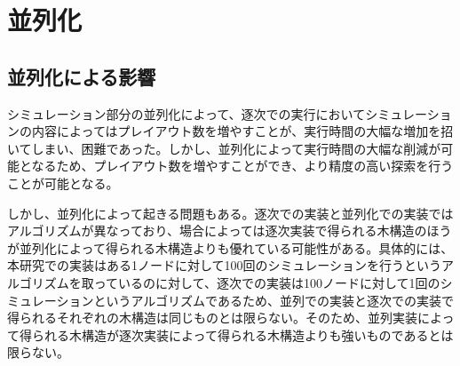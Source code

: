 \documentclass[10pt, a4paper]{jsarticle}
\begin{document}
\section{並列化}
\subsection{並列化による影響}
シミュレーション部分の並列化によって、逐次での実行においてシミュレーションの内容によってはプレイアウト数を増やすことが、実行時間の大幅な増加を招いてしまい、困難であった。しかし、並列化によって実行時間の大幅な削減が可能となるため、プレイアウト数を増やすことができ、より精度の高い探索を行うことが可能となる。
\par しかし、並列化によって起きる問題もある。逐次での実装と並列化での実装ではアルゴリズムが異なっており、場合によっては逐次実装で得られる木構造のほうが並列化によって得られる木構造よりも優れている可能性がある。具体的には、本研究での実装はある1ノードに対して100回のシミュレーションを行うというアルゴリズムを取っているのに対して、逐次での実装は100ノードに対して1回のシミュレーションというアルゴリズムであるため、並列での実装と逐次での実装で得られるそれぞれの木構造は同じものとは限らない。そのため、並列実装によって得られる木構造が逐次実装によって得られる木構造よりも強いものであるとは限らない。
\end{document}

